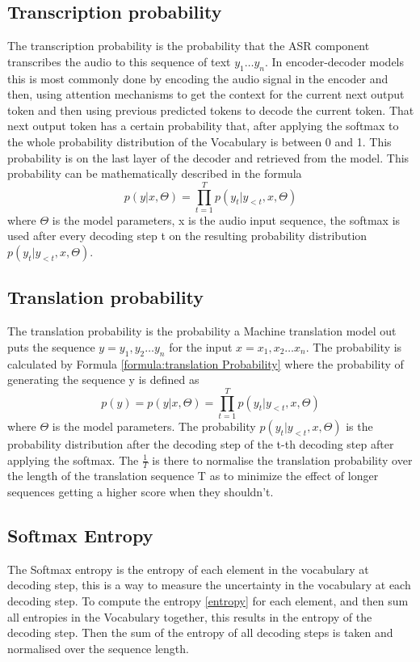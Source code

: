 \subsection{Transcription probability}
The transcription probability is the probability that the ASR component transcribes the audio to this sequence of text $y_1\dots y_n$. 
In encoder-decoder models this is most commonly done by encoding the audio signal in the encoder and then, using attention mechanisms to get the context for the current next output token and then using previous predicted tokens to decode the current token. 
That next output token has a certain probability that, after applying the softmax to the whole probability distribution of the Vocabulary is between 0 and 1. This probability is on the last layer of the decoder and retrieved from the model. 
This probability can be mathematically described in the formula $$p(y|x,\Theta)=\prod_{t=1}^T p(y_t|y_{<t}, x, \Theta) $$ where $\Theta$ is the model parameters, x is the audio input sequence, the softmax is used after every decoding step t on the resulting probability distribution $p(y_t|y_{<t}, x,\Theta)$. 

\subsection{Translation probability}
The translation probability is the probability a Machine translation model out puts the sequence $y = y_1, y_2 \dots y_n$ for the input $x=x_1, x_2 \dots x_n$. The probability is calculated by Formula \autoref{formula:translation Probability} where the probability of generating the sequence y is defined as $$ p(y)=p(y|x,\Theta)=\prod_{t=1}^T p(y_t|y_{<t}, x, \Theta)$$ where $\Theta$ is the model parameters.
The probability $p(y_t|y_{<t}, x,\Theta)$ is the probability distribution after the decoding step of the t-th decoding step after applying the softmax.
The $\frac{1}{T}$ is there to normalise the translation probability over the length of the translation sequence T as to minimize the effect of longer sequences getting a higher score when they shouldn't. 


\subsection{Softmax Entropy}\label{sect:entropy}
The Softmax entropy is the entropy of each element in the vocabulary at decoding step, this is a way to measure the uncertainty in the vocabulary at each decoding step.
To compute the entropy \autoref{entropy} for each element, and then sum all entropies in the Vocabulary together, this results in the entropy of the decoding step. 
Then the sum of the entropy of all decoding steps is taken and normalised over the sequence length. 

